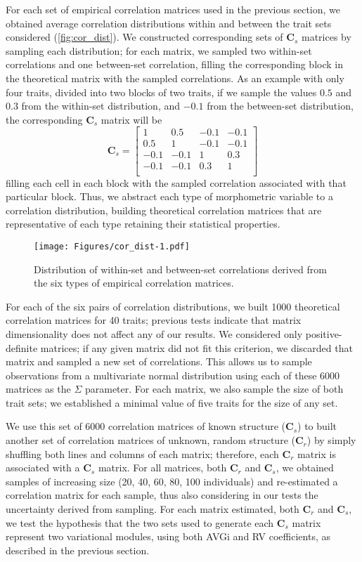 \documentclass[11pt,twoside]{report}
\begin{document}
For each set of empirical correlation matrices used in the previous
section, we obtained average correlation distributions within and
between the trait sets considered (\autoref{fig:cor_dist}). We
constructed corresponding sets of $\mathbf{C}_{s}$ matrices by sampling
each distribution; for each matrix, we sampled two within-set
correlations and one between-set correlation, filling the corresponding
block in the theoretical matrix with the sampled correlations. As an
example with only four traits, divided into two blocks of two traits, if
we sample the values $0.5$ and $0.3$ from the within-set distribution,
and $-0.1$ from the between-set distribution, the corresponding
$\mathbf{C}_{s}$ matrix will be \[
\mathbf{C}_s =
\begin{bmatrix}
1 & 0.5 & -0.1 & -0.1 \\
0.5 & 1 & -0.1 & -0.1 \\
-0.1 & -0.1 & 1 & 0.3 \\
-0.1 & -0.1 & 0.3 & 1 \\
\end{bmatrix}
\] filling each cell in each block with the sampled correlation
associated with that particular block. Thus, we abstract each type of
morphometric variable to a correlation distribution, building
theoretical correlation matrices that are representative of each type
retaining their statistical properties.

\begin{figure}[htbp]
\centering
\texttt{[image: Figures/cor\_dist-1.pdf]}
\caption{Distribution of within-set and between-set correlations derived
from the six types of empirical correlation matrices.
\label{fig:cor_dist}}
\end{figure}

For each of the six pairs of correlation distributions, we built 1000
theoretical correlation matrices for 40 traits; previous tests indicate
that matrix dimensionality does not affect any of our results. We
considered only positive-definite matrices; if any given matrix did not
fit this criterion, we discarded that matrix and sampled a new set of
correlations. This allows us to sample observations from a multivariate
normal distribution using each of these 6000 matrices as the $\Sigma$
parameter. For each matrix, we also sample the size of both trait sets;
we established a minimal value of five traits for the size of any set.

We use this set of 6000 correlation matrices of known structure
($\mathbf{C}_s$) to built another set of correlation matrices of
unknown, random structure ($\mathbf{C}_r$) by simply shuffling both
lines and columns of each matrix; therefore, each $\mathbf{C}_r$ matrix
is associated with a $\mathbf{C}_s$ matrix. For all matrices, both
$\mathbf{C}_r$ and $\mathbf{C}_s$, we obtained samples of increasing
size (20, 40, 60, 80, 100 individuals) and re-estimated a correlation
matrix for each sample, thus also considering in our tests the
uncertainty derived from sampling. For each matrix estimated, both
$\mathbf{C}_r$ and $\mathbf{C}_s$, we test the hypothesis that the two
sets used to generate each $\mathbf{C}_s$ matrix represent two
variational modules, using both AVGi and RV coefficients, as described
in the previous section.
\end{document}
